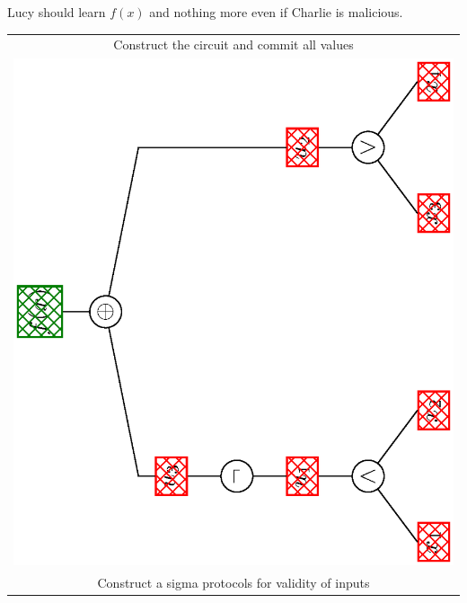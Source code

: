 \documentclass[landscape,dvips,footrule]{foils}
\begin{document}

\enlargethispage{1cm}

Lucy should learn $f(x)$ and nothing more even if Charlie is malicious.



\enlargethispage{1cm}

\begin{center}
\begin{tabular}{|c|}
 \hline
 Construct the circuit and commit all values\\
  \includegraphics[scale=0.18, angle=-90, clip, trim=3.5cm 0.0cm 3.5cm 0.0cm]{boolean-circuit.eps}\\  
\hline
 Construct a sigma protocols for validity of inputs\\

\end{tabular}
\end{center}
\end{document}
